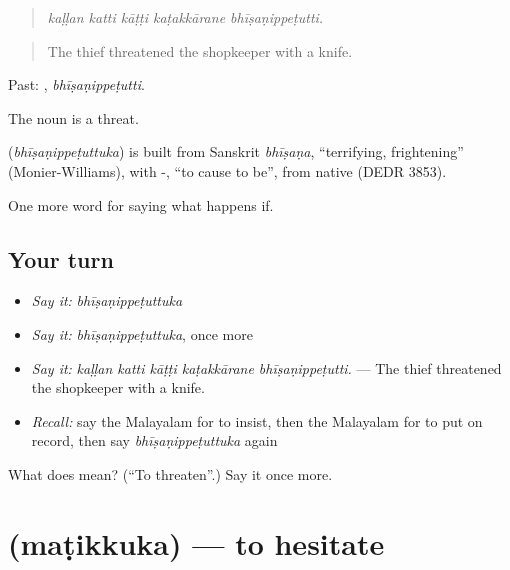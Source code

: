 \begin{quote}
\emph{kaḷḷan katti kāṭṭi kaṭakkārane bhīṣaṇippeṭutti.}
\end{quote}

\begin{quote}
The thief threatened the shopkeeper with a knife.
\end{quote}

Past: , \emph{bhīṣaṇippeṭutti}.

The noun  is a threat.

\begin{cousinweb}
\textbf{} (\emph{bhīṣaṇippeṭuttuka}) is built from Sanskrit \emph{bhīṣaṇa}, \textquotedblleft{}terrifying, frightening\textquotedblright{} (Monier-Williams), with -, \textquotedblleft{}to cause to be\textquotedblright{}, from native  (DEDR 3853).
\end{cousinweb}

\begin{grammarlens}[title={What you've built}]
One more word for saying what happens if.
\end{grammarlens}

\subsection*{Your turn}
\begin{itemize}
\raggedright
  \item \emph{Say it:} \emph{bhīṣaṇippeṭuttuka}
  \item \emph{Say it:} \emph{bhīṣaṇippeṭuttuka}, once more
  \item \emph{Say it:} \emph{kaḷḷan katti kāṭṭi kaṭakkārane bhīṣaṇippeṭutti.} — The thief threatened the shopkeeper with a knife.
  \item \emph{Recall:} say the Malayalam for to insist, then the Malayalam for to put on record, then say \emph{bhīṣaṇippeṭuttuka} again
\end{itemize}

\begin{tcolorbox}[breakable,colback=teal!4,colframe=teal!35!black,title={Before you move on}]
What does  mean? (\textquotedblleft{}To threaten\textquotedblright{}.) Say it once more.
\end{tcolorbox}
\section[\texorpdfstring{\ml{മടിക്കുക} (maṭikkuka)}{മടിക്കുക (maṭikkuka)}]{ (maṭikkuka) — to hesitate}

